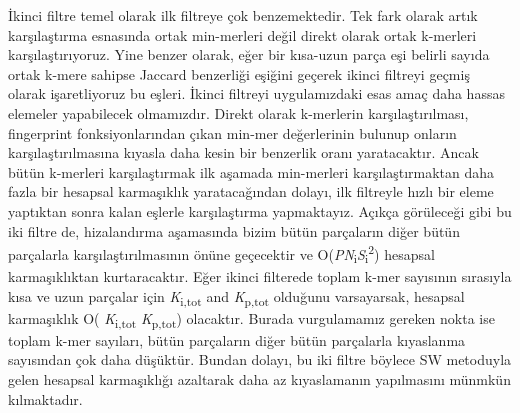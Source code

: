 İkinci filtre temel olarak ilk filtreye çok benzemektedir. Tek fark olarak artık karşılaştırma esnasında ortak min-merleri değil direkt olarak ortak k-merleri karşılaştırıyoruz. Yine benzer olarak, eğer bir kısa-uzun parça eşi belirli sayıda ortak k-mere sahipse Jaccard benzerliği eşiğini geçerek ikinci filtreyi geçmiş olarak işaretliyoruz bu eşleri. İkinci filtreyi uygulamızdaki esas amaç daha hassas elemeler yapabilecek olmamızdır. Direkt olarak k-merlerin karşılaştırılması, fingerprint fonksiyonlarından çıkan min-mer değerlerinin bulunup onların karşılaştırılmasına kıyasla daha kesin bir benzerlik oranı yaratacaktır. Ancak bütün k-merleri karşılaştırmak ilk aşamada min-merleri karşılaştırmaktan daha fazla bir hesapsal karmaşıklık yaratacağından dolayı, ilk filtreyle hızlı bir eleme yaptıktan sonra kalan eşlerle karşılaştırma yapmaktayız. Açıkça görüleceği gibi bu iki filtre de, hizalandırma aşamasında bizim bütün parçaların diğer bütün parçalarla karşılaştırılmasının önüne geçecektir ve O(\textit{P}\textit{N}\textsubscript{i}\textbar\textit{S}\textsubscript{i}\textbar\textsuperscript{2}) hesapsal karmaşıklıktan kurtaracaktır. Eğer ikinci filterede toplam k-mer sayısının sırasıyla kısa ve uzun parçalar için \textit{K}\textsubscript{i,tot} and \textit{K}\textsubscript{p,tot} olduğunu varsayarsak, hesapsal karmaşıklık O( \textit{K}\textsubscript{i,tot} \textit{K}\textsubscript{p,tot}) olacaktır. Burada vurgulamamız gereken nokta ise toplam k-mer sayıları, bütün parçaların diğer bütün parçalarla kıyaslanma sayısından çok daha düşüktür. Bundan dolayı, bu iki filtre böylece SW metoduyla gelen hesapsal karmaşıklığı azaltarak daha az kıyaslamanın yapılmasını münmkün kılmaktadır.